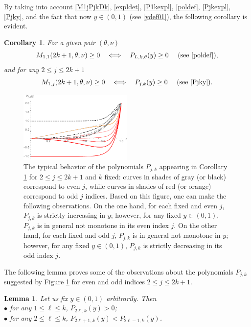 \documentclass[a4paper]{article}
\newtheorem{lemma}{Lemma}
\newtheorem{corollary}{Corollary}
\newcommand{\te}{\theta}
\newcommand{\Pol}{P_{L,k,\te}(y)}
\begin{document}
By taking into account \eqref{M1jPjkDk}, \eqref{expldet}, \eqref{P1kexpl}, \eqref{poldef}, \eqref{Pjkexpl}, \eqref{Pjky}, and the fact that now $y\in(0,1)$ (see \eqref{ydef01}), the following corollary is evident.
\begin{corollary}\label{cor2} For a given pair $(\te,\nu)$
\[
M_{1,1}(2k+1,\te,\nu)\ge 0 \quad \Longleftrightarrow \quad \Pol\ge 0\quad\text{ (see } \eqref{poldef}\text{)},
\]
and for any $2\le j\le 2k+1$
\[
M_{1,j}(2k+1,\te,\nu)\ge 0 \quad \Longleftrightarrow \quad P_{j,k}(y)\ge 0\quad\text{ (see } \eqref{Pjky}\text{)}.
\]
\end{corollary}
\begin{figure}
\begin{center}
\includegraphics[width=0.5\textwidth]{fig_excepttopleft.pdf}
\caption{The typical behavior of the polynomials $P_{j,k}$ appearing in Corollary \ref{cor2} for $2\le j\le 2k+1$ and $k$ fixed: curves in shades of gray (or black) correspond to even $j$, while curves in shades of red (or orange) correspond to odd $j$ indices. Based on this figure, one can make the following observations. On the one hand, for each fixed and even $j$, $P_{j,k}$ is strictly increasing in $y$; however, for any fixed $y\in(0,1)$, $P_{j,k}$ is in general not monotone in its even index $j$. On the other hand, for each fixed and odd $j$, $P_{j,k}$ is in general not monotone in $y$; however, for any fixed $y\in(0,1)$, $P_{j,k}$ is strictly decreasing in its odd index $j$.}\label{fig_excepttopleft}
\end{center}
\end{figure}
The following lemma proves some of the observations about the polynomials $P_{j,k}$ suggested by Figure \ref{fig_excepttopleft} for even and odd indices $2\le j\le 2k+1$.
\begin{lemma}\label{lem2} Let us fix $y\in(0,1)$ arbitrarily. Then\\
\indent $\bullet$ for any $1\le\ell\le k$, $P_{2\ell,k}(y)>0$;\\
\indent $\bullet$ for any $2\le\ell\le k$, $P_{2\ell+1,k}(y)<P_{2\ell-1,k}(y)$. 
\end{lemma}
\end{document}
